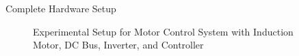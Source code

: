 \begin{frame}{Complete Hardware Setup}
	\begin{figure}
		\centering
		\caption{Experimental Setup for Motor Control System with Induction Motor, DC Bus, Inverter, and Controller}
	\end{figure}
\end{frame}

